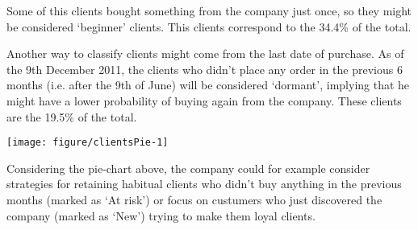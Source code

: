 \documentclass[12pt,a4paper,oneside,italian]{book}\usepackage{knitr}
\begin{document}
Some of this clients bought something from the company just once, so they might be considered `beginner' clients. This clients correspond to the 34.4\% of the total.

Another way to classify clients might come from the last date of purchase. As of the 9th December 2011, the clients who didn't place any order in the previous 6 months (i.e. after the 9th of June) will be considered `dormant', implying that he might have a lower probability of buying again from the company. These clients are the 19.5\% of the total.



{\centering \texttt{[image: figure/clientsPie-1]} 

}





Considering the pie-chart above, the company could for example consider strategies for retaining habitual clients who didn't buy anything in the previous months (marked as `At risk') or focus on custumers who just discovered the company (marked as `New') trying to make them loyal clients.
\end{document}
